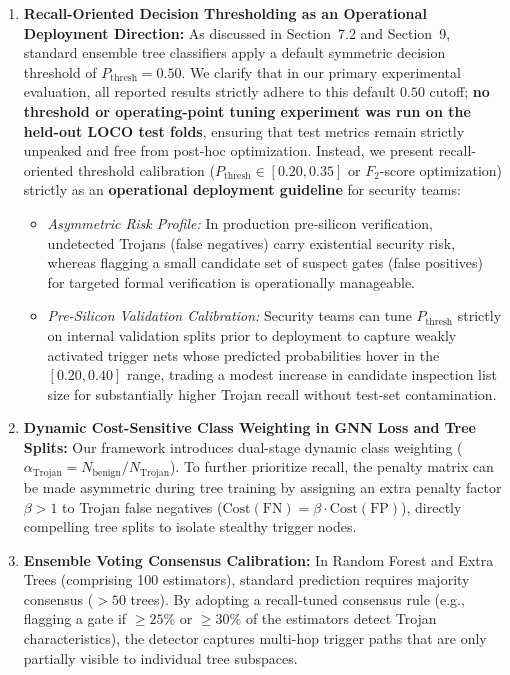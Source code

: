 \documentclass[11pt,a4paper]{article}
\begin{document}
\begin{enumerate}[leftmargin=*]
    \item \textbf{Recall-Oriented Decision Thresholding as an Operational Deployment Direction:}
    As discussed in Section~7.2 and Section~9, standard ensemble tree classifiers apply a default symmetric decision threshold of $P_{\text{thresh}} = 0.50$. We clarify that in our primary experimental evaluation, all reported results strictly adhere to this default $0.50$ cutoff; \textbf{no threshold or operating-point tuning experiment was run on the held-out LOCO test folds}, ensuring that test metrics remain strictly unpeaked and free from post-hoc optimization. Instead, we present recall-oriented threshold calibration ($P_{\text{thresh}} \in [0.20, 0.35]$ or $F_2$-score optimization) strictly as an \textbf{operational deployment guideline} for security teams:
    \begin{itemize}
        \item \textit{Asymmetric Risk Profile:} In production pre-silicon verification, undetected Trojans (false negatives) carry existential security risk, whereas flagging a small candidate set of suspect gates (false positives) for targeted formal verification is operationally manageable.
        \item \textit{Pre-Silicon Validation Calibration:} Security teams can tune $P_{\text{thresh}}$ strictly on internal validation splits prior to deployment to capture weakly activated trigger nets whose predicted probabilities hover in the $[0.20, 0.40]$ range, trading a modest increase in candidate inspection list size for substantially higher Trojan recall without test-set contamination.
    \end{itemize}

    \item \textbf{Dynamic Cost-Sensitive Class Weighting in GNN Loss and Tree Splits:}
    Our framework introduces dual-stage dynamic class weighting ($\alpha_{\text{Trojan}} = N_{\text{benign}} / N_{\text{Trojan}}$). To further prioritize recall, the penalty matrix can be made asymmetric during tree training by assigning an extra penalty factor $\beta > 1$ to Trojan false negatives ($\text{Cost}(\text{FN}) = \beta \cdot \text{Cost}(\text{FP})$), directly compelling tree splits to isolate stealthy trigger nodes.

    \item \textbf{Ensemble Voting Consensus Calibration:}
    In Random Forest and Extra Trees (comprising 100 estimators), standard prediction requires majority consensus ($> 50$ trees). By adopting a recall-tuned consensus rule (e.g., flagging a gate if $\ge 25\%$ or $\ge 30\%$ of the estimators detect Trojan characteristics), the detector captures multi-hop trigger paths that are only partially visible to individual tree subspaces.


\end{enumerate}
\end{document}
